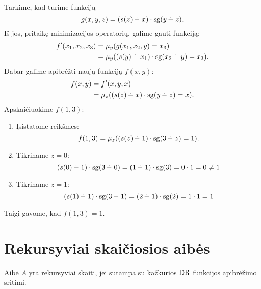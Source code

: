 \begin{exmp}
  Tarkime, kad turime funkciją
  \begin{equation*}
    g(x, y, z) = (s(z) \mathop{\mbox{$-^{\hspace{-.5em}\cdot}\,\,$}} x) \cdot \operatorname{sg}(y \mathop{\mbox{$-^{\hspace{-.5em}\cdot}\,\,$}} z).
  \end{equation*}
  Iš jos, pritaikę minimizacijos operatorių, galime gauti funkciją:
  \begin{align*}
    f'(x_1, x_2, x_3)
    &= \mu_y(g(x_1, x_2, y) = x_3) \\
    &= \mu_y((s(y) \mathop{\mbox{$-^{\hspace{-.5em}\cdot}\,\,$}} x_1) \cdot \operatorname{sg}(x_2 \mathop{\mbox{$-^{\hspace{-.5em}\cdot}\,\,$}} y) = x_3). \\
  \end{align*}
  Dabar galime apibrėžti naują funkciją $f(x, y)$:
  \begin{align*}
    f(x, y)
    &= f'(x, y, x) \\
    &= \mu_z((s(z) \mathop{\mbox{$-^{\hspace{-.5em}\cdot}\,\,$}} x) \cdot \operatorname{sg}(y \mathop{\mbox{$-^{\hspace{-.5em}\cdot}\,\,$}} z) = x).
  \end{align*}
  Apskaičiuokime $f(1, 3)$:
  \begin{enumerate}
    \item Įsistatome reikšmes:
      \begin{equation*}
        f(1, 3) = \mu_z((s(z) \mathop{\mbox{$-^{\hspace{-.5em}\cdot}\,\,$}} 1) \cdot \operatorname{sg}(3 \mathop{\mbox{$-^{\hspace{-.5em}\cdot}\,\,$}} z) = 1).
      \end{equation*}
    \item Tikriname $z = 0$:
      \begin{equation*}
        (s(0) \mathop{\mbox{$-^{\hspace{-.5em}\cdot}\,\,$}} 1) \cdot \operatorname{sg}(3 \mathop{\mbox{$-^{\hspace{-.5em}\cdot}\,\,$}} 0)
          = (1 \mathop{\mbox{$-^{\hspace{-.5em}\cdot}\,\,$}} 1) \cdot \operatorname{sg}(3)
          = 0 \cdot 1
          = 0
          \neq 1
      \end{equation*}
    \item Tikriname $z = 1$:
      \begin{equation*}
        (s(1) \mathop{\mbox{$-^{\hspace{-.5em}\cdot}\,\,$}} 1) \cdot \operatorname{sg}(3 \mathop{\mbox{$-^{\hspace{-.5em}\cdot}\,\,$}} 1)
          = (2 \mathop{\mbox{$-^{\hspace{-.5em}\cdot}\,\,$}} 1) \cdot \operatorname{sg}(2)
          = 1 \cdot 1
          = 1
      \end{equation*}
  \end{enumerate}
  Taigi gavome, kad $f(1, 3) = 1$.
\end{exmp}

\section{Rekursyviai skaičiosios aibės}

\begin{defn}
  \label{rsadr}
  Aibė $A$ yra rekursyviai skaiti, jei sutampa su kažkurios $\mathop{\text{DR}}$ funkcijos
  apibrėžimo sritimi.
\end{defn}


